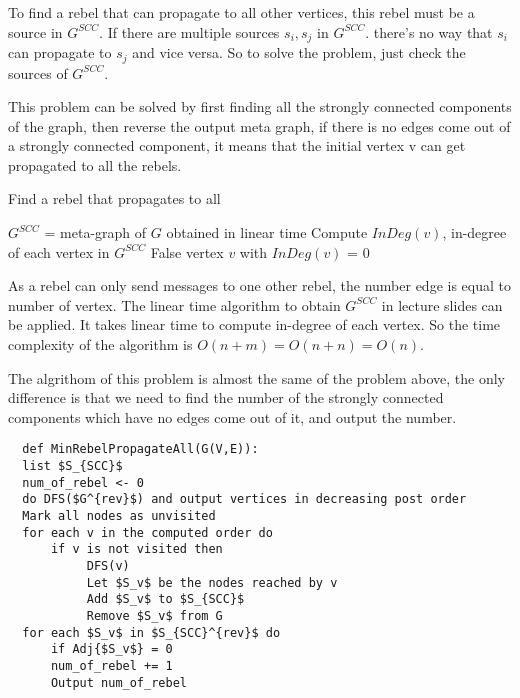 \documentclass[12pt,a4paper]{article}
\newcommand{\question}[1]{\bigskip\noindent{\textbf{Q{#1} solution}}}
\begin{document}
To find a rebel that can propagate to all other vertices, this rebel must be a source in $G^{SCC}$. If there are multiple sources $s_i,s_j$ in $G^{SCC}$. there's no way that $s_i$ can propagate to $s_j$ and vice versa. So to solve the problem, just check the sources of $G^{SCC}$.  

This problem can be solved by first finding all the strongly connected components of the graph, then reverse the output meta graph, if there is no edges come out of a strongly connected component, it means that 
the initial vertex v can get propagated to all the rebels.

\begin{algorithm}
\caption{Find a rebel that propagates to all}\label{alg:q24A}
\begin{algorithmic}
    \State $G^{SCC}$ = meta-graph of $G$ obtained in linear time
    \State Compute $InDeg(v)$, in-degree of each vertex in $G^{SCC}$
      \State \Return False
    \Else
      \State \Return vertex $v$ with $InDeg(v)$ = 0
    \EndIf
  \EndFunction
\end{algorithmic}
\end{algorithm}

As a rebel can only send messages to one other rebel, the number edge is equal to number of vertex. The linear time algorithm to obtain $G^{SCC}$ in lecture slides can be applied. It takes linear time to compute in-degree of each vertex. So the time complexity of the algorithm is $O(n + m) = O(n + n) = O(n)$.

\question{24.B}

The algrithom of this problem is almost the same of the problem above, the only difference is that we need to find the number of the strongly connected components which
have no edges come out of it, and output the number.

\begin{lstlisting}
  def MinRebelPropagateAll(G(V,E)):
  list $S_{SCC}$
  num_of_rebel <- 0
  do DFS($G^{rev}$) and output vertices in decreasing post order
  Mark all nodes as unvisited
  for each v in the computed order do
      if v is not visited then 
           DFS(v)
           Let $S_v$ be the nodes reached by v
           Add $S_v$ to $S_{SCC}$
           Remove $S_v$ from G
  for each $S_v$ in $S_{SCC}^{rev}$ do
      if Adj{$S_v$} = 0
      num_of_rebel += 1
      Output num_of_rebel  
\end{lstlisting}
\end{document}
